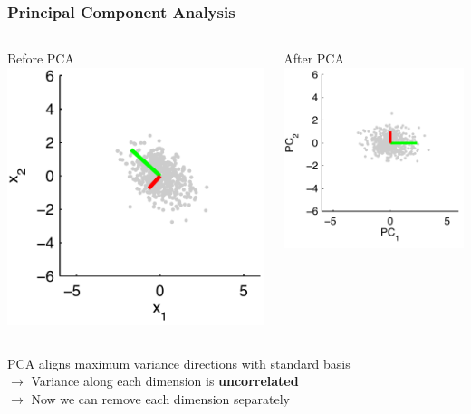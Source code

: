 \documentclass[Nike]{tuberlinbeamer}
\begin{document}
\begin{frame}\frametitle{Principal Component Analysis}
\begin{columns}
\centering
Before PCA
\includegraphics[width=.8\textwidth]{figures/PCA_toy_before}

\pause
\centering
After PCA
\includegraphics[width=.8\textwidth]{figures/PCA_toy_after}
\end{columns}
\centering

\pause
PCA aligns maximum variance directions with standard basis\\
$\rightarrow$ Variance along each dimension is {\bf uncorrelated}\\
$\rightarrow$ Now we can remove each dimension separately\\
\end{frame}
\end{document}
